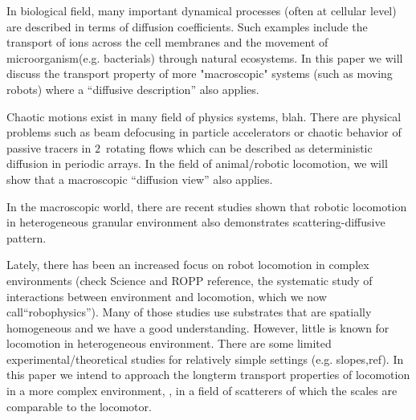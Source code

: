 In biological field,  many important dynamical processes (often at
cellular level) are described in  terms of diffusion coefficients. Such
examples include the transport of ions  across the cell
membranes and the movement of  microorganism(e.g.
bacterials) through natural  ecosystems. In this
paper we will discuss the transport  property of more "macroscopic"
systems (such as moving  robots) where a ``diffusive
description'' also applies.

Chaotic motions exist in many field of physics systems, blah. There are
physical problems such as beam defocusing in particle accelerators or
chaotic behavior of passive tracers in $2$\dmn\ rotating flows which can
be described as deterministic diffusion in periodic arrays. In the field
of animal/robotic locomotion, we will show that a macroscopic ``diffusion
view'' also applies.

In the macroscopic world, there are recent
studies shown that robotic locomotion in heterogeneous granular
environment also demonstrates scattering-diffusive pattern.

Lately, there has been an increased focus on robot locomotion in complex
environments (check Science and ROPP reference, the systematic study of
interactions between environment and locomotion, which we now
call``robophysics''). Many of those studies use substrates that are
spatially homogeneous and we have a good
understanding. However, little is
known for locomotion in heterogeneous environment. There are some limited
experimental/theoretical studies for relatively simple settings (e.g.
slopes,ref). In this paper we intend to approach the longterm transport
properties of locomotion in a more complex environment, \ie, in a field
of scatterers of which the scales are comparable to the locomotor.


